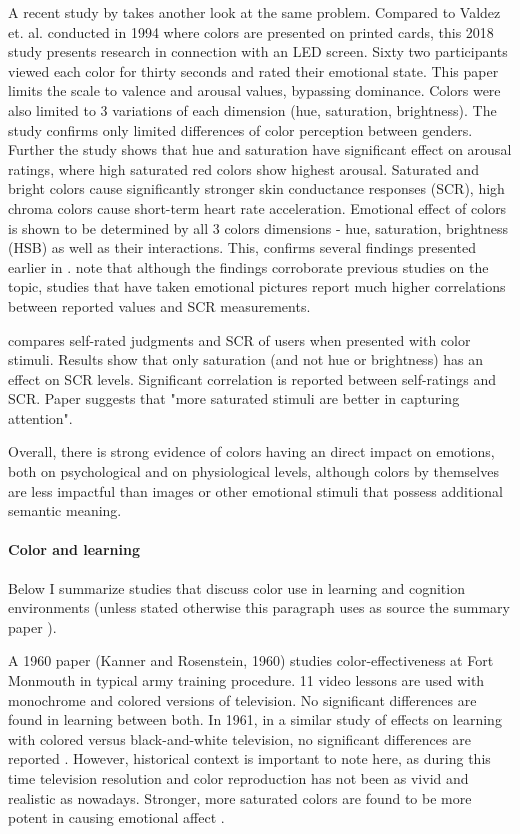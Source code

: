 		A recent study by \cite{Wilms2018} takes another look at the same problem. Compared to Valdez et. al. conducted in 1994 where colors are presented on printed cards, this 2018 study presents research in connection with an LED screen. Sixty two participants viewed each color for thirty seconds and rated their emotional state. This paper limits the scale to valence and arousal values, bypassing dominance. Colors were also limited to 3 variations of each dimension (hue, saturation, brightness). The study confirms only limited differences of color perception between genders. Further the study shows that hue and saturation have significant effect on arousal ratings, where high saturated red colors show highest arousal. Saturated and bright colors cause significantly stronger skin conductance responses (SCR), high chroma colors cause short-term heart rate acceleration. Emotional effect of colors is shown to be determined by all 3 colors dimensions - hue, saturation, brightness (HSB) as well as their interactions. This, confirms several findings presented earlier in \cite{Valdez1994}. \cite{Wilms2018} note that although the findings corroborate previous studies on the topic, studies that have taken emotional pictures report much higher correlations between reported values and SCR measurements.
				
		\cite{Zielinski2016} compares self-rated judgments and SCR of users when presented with color stimuli. Results show that only saturation (and not hue or brightness) has an effect on SCR levels. Significant correlation is reported between self-ratings and SCR. Paper suggests that "more saturated stimuli are better in capturing attention".
		
		Overall, there is strong evidence of colors having an direct impact on emotions, both on psychological and on physiological levels, although colors by themselves are less impactful than images or other emotional stimuli that possess additional semantic meaning.
		
		
		\paragraph{Color and learning} Below I summarize studies that discuss color use in learning and cognition environments (unless stated otherwise this paragraph uses as source the summary paper \cite{Pert1996}).
		
		A 1960 paper (Kanner and Rosenstein, 1960) studies color-effectiveness at Fort Monmouth in typical army training procedure. 11 video lessons are used with monochrome and colored versions of television. No significant differences are found in learning between both. In 1961, in a similar study of effects on learning with colored versus black-and-white television, no significant differences are reported \cite{Pert1996}.
		However, historical context is important to note here, as during this time television resolution and color reproduction has not been as vivid and realistic as nowadays. Stronger, more saturated colors are found to be more potent in causing emotional affect \cite{Valdez1994}.
		
